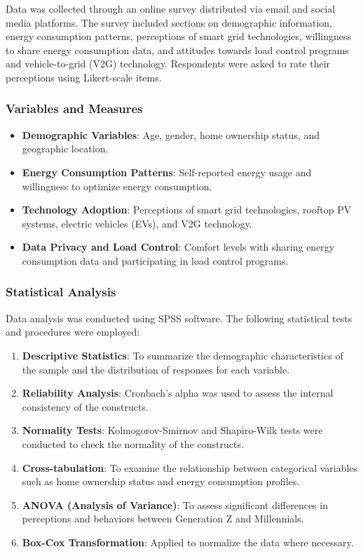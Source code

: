 \documentclass[
  letterpaper,
  DIV=11,
  numbers=noendperiod]{scrartcl}
\providecommand{\tightlist}{%
  \setlength{\itemsep}{0pt}\setlength{\parskip}{0pt}}\usepackage{longtable,booktabs,array}
\begin{document}
Data was collected through an online survey distributed via email and
social media platforms. The survey included sections on demographic
information, energy consumption patterns, perceptions of smart grid
technologies, willingness to share energy consumption data, and
attitudes towards load control programs and vehicle-to-grid (V2G)
technology. Respondents were asked to rate their perceptions using
Likert-scale items.

\subsubsection{Variables and Measures}\label{variables-and-measures}

\begin{itemize}
\tightlist
\item
  \textbf{Demographic Variables}: Age, gender, home ownership status,
  and geographic location.
\item
  \textbf{Energy Consumption Patterns}: Self-reported energy usage and
  willingness to optimize energy consumption.
\item
  \textbf{Technology Adoption}: Perceptions of smart grid technologies,
  rooftop PV systems, electric vehicles (EVs), and V2G technology.
\item
  \textbf{Data Privacy and Load Control}: Comfort levels with sharing
  energy consumption data and participating in load control programs.
\end{itemize}

\subsubsection{Statistical Analysis}\label{statistical-analysis}

Data analysis was conducted using SPSS software. The following
statistical tests and procedures were employed:

\begin{enumerate}
\def\labelenumi{\arabic{enumi}.}
\tightlist
\item
  \textbf{Descriptive Statistics}: To summarize the demographic
  characteristics of the sample and the distribution of responses for
  each variable.
\item
  \textbf{Reliability Analysis}: Cronbach's alpha was used to assess the
  internal consistency of the constructs.
\item
  \textbf{Normality Tests}: Kolmogorov-Smirnov and Shapiro-Wilk tests
  were conducted to check the normality of the constructs.
\item
  \textbf{Cross-tabulation}: To examine the relationship between
  categorical variables such as home ownership status and energy
  consumption profiles.
\item
  \textbf{ANOVA (Analysis of Variance)}: To assess significant
  differences in perceptions and behaviors between Generation Z and
  Millennials.
\item
  \textbf{Box-Cox Transformation}: Applied to normalize the data where
  necessary.
\end{enumerate}
\end{document}
